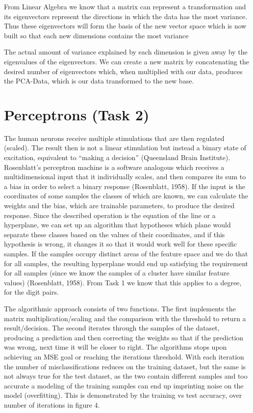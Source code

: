 \documentclass{article}
\begin{document}
From Linear Algebra we know that a matrix can represent a transformation and its eigenvectors represent the directions in which the data has the most variance.
Thus these eigenvectors will form the basis of the new vector space which is now built so that each new dimensions contains the most variance

The actual amount of variance explained by each dimension is given away by the eigenvalues of the eigenvectors.
We can create a new matrix by concatenating the desired number of eigenvectors which, when multiplied with our data, produces the PCA-Data, which is our data transformed to the new base. 

\section{Perceptrons (Task 2)}

The human neurons receive multiple stimulations that are then regulated (scaled).
The result then is not a linear stimulation but instead a binary state of excitation, equivalent to “making a decision” (Queensland Brain Institute).
Rosenblatt’s perceptron machine is a software analogous which receives a multidimensional input that it individually scales, and then compares its sum to a bias in order to select a binary response (Rosenblatt, 1958).
If the input is the coordinates of some samples the classes of which are known, we can calculate the weights and the bias, which are trainable parameters, to produce the desired response.
Since the described operation is the equation of the line or a hyperplane, we can set up an algorithm that hypotheses which plane would separate these classes based on the values of their coordinates, and if this hypothesis is wrong, it changes it so that it would work well for these specific samples.
If the samples occupy distinct areas of the feature space and we do that for all samples, the resulting hyperplane would end up satisfying the requirement for all samples (since we know the samples of a cluster have similar feature values) (Rosenblatt, 1958).
From Task 1 we know that this applies to a degree, for the digit pairs.

The algorithmic approach consists of two functions.
The first implements the matrix multiplication/scaling and the comparison with the threshold to return a result/decision.
The second iterates through the samples of the dataset, producing a prediction and then correcting the weights so that if the prediction was wrong, next time it will be closer to right.
The algorithms stops upon achieving an MSE goal or reaching the iterations threshold.
With each iteration the number of misclassifications reduces on the training dataset, but the same is not always true for the test dataset, as the two contain different samples and too accurate a modeling of the training samples can end up imprinting noise on the model (overfitting).
This is demonstrated by the training vs test accuracy, over number of iterations in figure 4.
\end{document}
